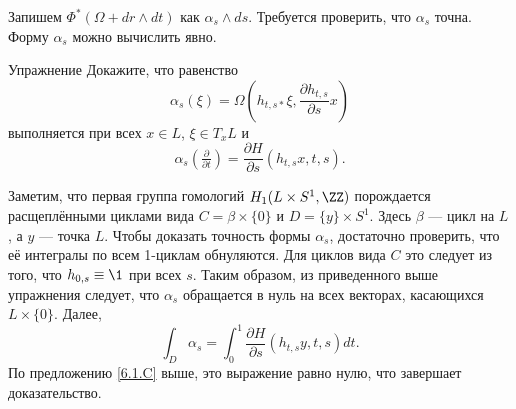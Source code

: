 Запишем $\Phi^\ast (\Omega + dr \wedge dt)$ как $\alpha_s \wedge ds$.
Требуется проверить, что $\alpha_s$ точна.
Форму $\alpha_s$ можно вычислить явно.

\begin{thm*}{Упражнение}
Докажите, что равенство
\[\alpha_s (\xi) = \Omega (h_{t, s\ast} \xi, \frac{\partial h_{t, s}}{\partial s}x)\] 
выполняется при всех
$x \in L$, $\xi \in T_x L$ и 
\[\alpha_s (\tfrac{\partial}{\partial t}) = \frac{\partial H}{\partial s}(h_{t, s}x, t, s).\]
\end{thm*}

Заметим, что первая группа гомологий $H_1 (L \times S^1, \ZZ)$ порождается расщеплёнными циклами вида $C = \beta \times \{0\}$ и $D = \{y\} \times S^1$.
Здесь $\beta$ --- цикл на $L$, а $y$ --- точка $L$.
Чтобы доказать точность формы $\alpha_s$, достаточно проверить, что её интегралы по всем 1-циклам обнуляются.
Для циклов вида $C$ это следует из того, что $h_{0, s} \equiv \1$ при всех $s$.
Таким образом, из приведенного выше упражнения следует, что $\alpha_s$ обращается в нуль на всех векторах, касающихся $L \times \{0\}$.
Далее, 
\[\int_D \alpha_s
= \int_0^1 \frac{\partial H}{\partial s} (h_{t, s} y, t, s) dt. 
\]
По предложению \ref{6.1.C} выше,
это выражение равно нулю, что завершает доказательство.
\qeds
